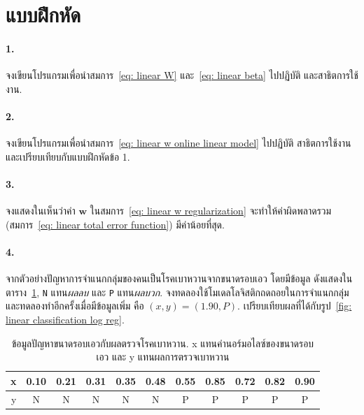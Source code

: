 \section{แบบฝึกหัด}
\label{section: linear exercises}


\paragraph{1.} จงเขียนโปรแกรมเพื่อนำสมการ~\ref{eq: linear W} และ~\ref{eq: linear beta} ไปปฏิบัติ
และสาธิตการใช้งาน.

\paragraph{2.} จงเขียนโปรแกรมเพื่อนำสมการ~\ref{eq: linear w online linear model} ไปปฏิบัติ
สาธิตการใช้งาน และเปรียบเทียบกับแบบฝึกหัดข้อ 1.

\paragraph{3.} จงแสดงในเห็นว่าค่า $\mathbf{w}$ ในสมการ~\ref{eq: linear w regularization} จะทำให้ค่าผิดพลาดรวม (สมการ~\ref{eq: linear total error function}) มีค่าน้อยที่สุด.


\paragraph{4.} จากตัวอย่างปัญหาการจำแนกกลุ่มของคนเป็นโรคเบาหวานจากขนาดรอบเอว 
โดยมีข้อมูล ดังแสดงในตาราง~\ref{tbl: linear ex logistic regression diabetes}, 
\texttt{N} แทน\textit{ผลลบ} และ \texttt{P} แทน\textit{ผลบวก}.
จงทดลองใช้โมเดลโลจิสติกถดถอยในการจำแนกกลุ่ม 
และทดลองทำอีกครั้งเมื่อมีข้อมูลเพิ่ม คือ $(x,y) = (1.90, P)$.
เปรียบเทียบผลที่ได้กับรูป~\ref{fig: linear classification log reg}.

{\small
\begin{table}[hbtp]
\caption{ข้อมูลปัญหาขนาดรอบเอวกับผลตรวจโรคเบาหวาน.
x แทนค่านอร์มอไลซ์ของขนาดรอบเอว
และ y แทนผลการตรวจเบาหวาน}
\begin{center}
\begin{tabular}{|r|c|c|c|c|c|c|c|c|c|c|}
\hline 
x & 0.10 & 0.21 & 0.31 & 0.35 & 0.48 & 0.55 & 0.85 & 0.72 & 0.82 & 0.90 \\
\hline
y &   N &   N &   N &    N &    N &    P &    P &      P    &    P &   P \\
\hline
\end{tabular} 
\end{center}
\label{tbl: linear ex logistic regression diabetes}
\end{table}
}

